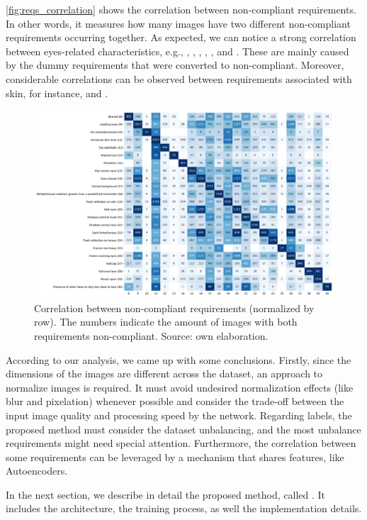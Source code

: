 \autoref{fig:reqs_correlation} shows the correlation between non-compliant requirements. In other words, it measures how many images have two different non-compliant requirements occurring together. As expected, we can notice a strong correlation between eyes-related characteristics, e.g., \lookingaway, \hairacrosseyes, \eyesclosed, \redeyes, \darktintedlenses, and \framecoveringeyes. These are mainly caused by the dummy requirements that were converted to non-compliant. Moreover, considerable correlations can be observed between requirements associated with skin, for instance, \unnaturalskintone and \flashskin. 

\begin{figure}[tb]
\centering
\includegraphics[width=\linewidth]{images/reqs_correlation.pdf}
\caption{Correlation between non-compliant requirements (normalized by row). The numbers indicate the amount of images with both requirements non-compliant. Source: own elaboration.}
\label{fig:reqs_correlation}
\end{figure}

According to our analysis, we came up with some conclusions. Firstly, since the dimensions of the images are different across the dataset, an approach to normalize images is required. It must avoid undesired normalization effects (like blur and pixelation) whenever possible and consider the trade-off between the input image quality and processing speed by the network. Regarding labels, the proposed method must consider the dataset unbalancing, and the most unbalance requirements might need special attention. Furthermore, the correlation between some requirements can be leveraged by a mechanism that shares features, like Autoencoders.

In the next section, we describe in detail the proposed method, called \methodname. It includes the architecture, the training process, as well the implementation details.

